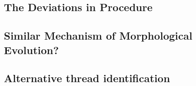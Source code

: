 \documentclass{aa}
\begin{document}
\subsection{The Deviations in Procedure}\label{sec:Section5_1}


\subsection{Similar Mechanism of Morphological Evolution?}\label{sec:Section5_2}





% 
% 
% 
\begin{appendix}
\section{Alternative thread identification}\label{app:Alt} 




\end{appendix}
\end{document}
